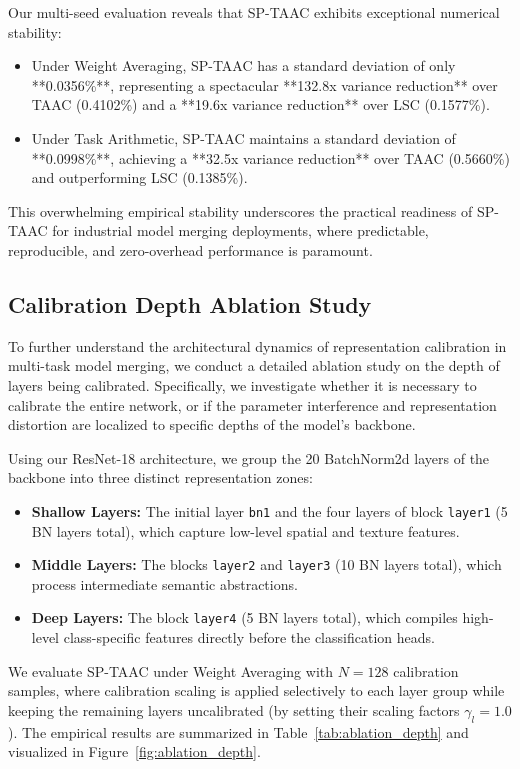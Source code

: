 \documentclass{article}
\theoremstyle{plain}
\theoremstyle{definition}
\theoremstyle{remark}
\begin{document}
Our multi-seed evaluation reveals that SP-TAAC exhibits exceptional numerical stability:
\begin{itemize}
    \item Under Weight Averaging, SP-TAAC has a standard deviation of only **0.0356\%**, representing a spectacular **132.8x variance reduction** over TAAC (0.4102\%) and a **19.6x variance reduction** over LSC (0.1577\%).
    \item Under Task Arithmetic, SP-TAAC maintains a standard deviation of **0.0998\%**, achieving a **32.5x variance reduction** over TAAC (0.5660\%) and outperforming LSC (0.1385\%).
\end{itemize}
This overwhelming empirical stability underscores the practical readiness of SP-TAAC for industrial model merging deployments, where predictable, reproducible, and zero-overhead performance is paramount.

\subsection{Calibration Depth Ablation Study}
To further understand the architectural dynamics of representation calibration in multi-task model merging, we conduct a detailed ablation study on the depth of layers being calibrated. Specifically, we investigate whether it is necessary to calibrate the entire network, or if the parameter interference and representation distortion are localized to specific depths of the model's backbone.

Using our ResNet-18 architecture, we group the 20 BatchNorm2d layers of the backbone into three distinct representation zones:
\begin{itemize}
    \item \textbf{Shallow Layers:} The initial layer \texttt{bn1} and the four layers of block \texttt{layer1} (5 BN layers total), which capture low-level spatial and texture features.
    \item \textbf{Middle Layers:} The blocks \texttt{layer2} and \texttt{layer3} (10 BN layers total), which process intermediate semantic abstractions.
    \item \textbf{Deep Layers:} The block \texttt{layer4} (5 BN layers total), which compiles high-level class-specific features directly before the classification heads.
\end{itemize}
We evaluate SP-TAAC under Weight Averaging with $N=128$ calibration samples, where calibration scaling is applied selectively to each layer group while keeping the remaining layers uncalibrated (by setting their scaling factors $\gamma_l = 1.0$). The empirical results are summarized in Table~\ref{tab:ablation_depth} and visualized in Figure~\ref{fig:ablation_depth}.
\end{document}
